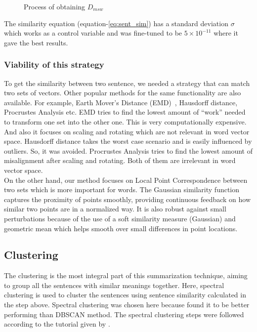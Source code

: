 \begin{figure}
    \centering
    
    \caption{Process of obtaining $D_{msw}$}
    \label{fig:msd}
\end{figure}

The similarity equation (equation-\ref{eq:sent_sim}) has a standard deviation $\sigma$ which works
as a control variable and was fine-tuned to be $5 \times 10^{-11}$ where it gave the best results.

\subsubsection{Viability of this strategy}
To get the similarity between two sentence, we needed a strategy that can match two sets of vectors.
Other popular methods for the same functionality are also available.
For example, Earth Mover's Distance (EMD)~\cite{Rubner-19998-emd}, Hausdorff distance, Procrustes Analysis etc.
EMD tries to find the lowest amount of ``work'' needed to transform one set into the other one.
This is very computationally expensive.
And also it focuses on scaling and rotating which are not relevant in word vector space.
Hausdorff distance takes the worst case scenario and is easily influenced by outliers.
So, it was avoided.
Procrustes Analysis tries to find the lowest amount of misalignment after scaling and rotating.
Both of them are irrelevant in word vector space.\\

On the other hand, our method focuses on Local Point Correspondence between two sets which is more
important for words.
The Gaussian similarity function captures the proximity of points smoothly,
providing continuous feedback on how similar two points are in a normalized way.
It is also robust against small perturbations because of the use of a soft similarity measure (Gaussian)
and geometric mean which helps smooth over small differences in point locations.

\subsection{Clustering}\label{subsec:clustering}
The clustering is the most integral part of this summarization technique, aiming to group all the
sentences with similar meanings together.
Here, spectral clustering is used to cluster the sentences using sentence similarity calculated in the step above.
Spectral clustering was chosen here because \citeauthor{roychowdhury-etal-2022-spectral-base}
\cite{roychowdhury-etal-2022-spectral-base} found it to be better performing than DBSCAN method.
The spectral clustering steps were followed according to the tutorial given by
\cite{vonLuxburg-2007-spectral-tutorial}. \\

